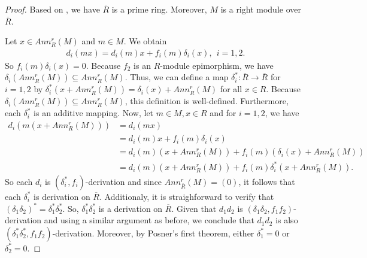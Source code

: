 \documentclass{arxiv}
\begin{document}
\begin{proof}
    Based on \cite[Proposition 2.2 (i)]{indah}, we have $\overline{R}$ is a prime ring. Moreover, $M$ is a right module over $\overline{R}$.

    
    Let $x \in Ann_R^r(M)$ and $m \in M$. We obtain
    \begin{align*}
        d_i (mx)=d_i(m)x+f_i(m)\delta_i(x), ~~ i=1,2.
    \end{align*}
    So $f_i(m)\delta_i(x)=0$. Because $f_2$ is an $R$-module epimorphism, we have $\delta_i(Ann_R^r(M)) \subseteq Ann_R^r(M)$. Thus, we can define a map $\delta_i^* : \overline{R} \rightarrow \overline{R}$ for $i=1,2$ by $\delta_i^* (x+Ann_R^r(M))=\delta_i(x)+Ann_R^r(M)$ for all $x \in R$. Because $\delta_i(Ann_R^r(M)) \subseteq Ann_R^r(M)$, this definition is well-defined. Furthermore, each $\delta_i^*$ is an additive mapping. Now, let $m \in M, x \in R$ and for $i=1,2$, we have
    \begin{align*}
        d_i(m(x+Ann_R^r(M))) &= d_i(mx)\\
        &= d_i(m)x+f_i(m)\delta_i (x) \\
        &= d_i(m)(x+Ann_R^r(M)) + f_i(m)(\delta_i(x)+Ann_R^r(M))\\
        &= d_i(m)(x+Ann_R^r(M)) + f_i(m)\delta_i^*(x+Ann_R^r(M)).
    \end{align*}
    So each $d_i$ is $(\delta_i^*,f_i)$-derivation and since $Ann_{\overline{R}}^r (M)=(0)$, it follows that each $\delta_i^*$ is derivation on $\overline{R}$. Additionaly, it is straighforward to verify that $(\delta_1\delta_2)^* = \delta_1^* \delta_2^*$. So,  $\delta_1^* \delta_2^*$ is a derivation on $\overline{R}$. Given that $d_1d_2$ is $(\delta_1\delta_2,f_1f_2)$-derivation and using a similar argument as before, we conclude that $d_1d_2$ is also $( \delta_1^* \delta_2^*,f_1f_2)$-derivation. Moreover, by Posner's first theorem, either $\delta_1^*=0$ or $\delta_2^*=0$.


\end{proof}
\end{document}
